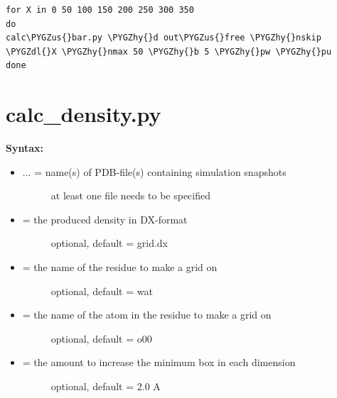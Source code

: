 \documentclass[letterpaper,10pt,english]{sphinxmanual}
\def\PYGZus{\char`\_}
\def\PYGZdl{\char`\$}
\def\PYGZhy{\char`\-}
\begin{document}
\begin{Verbatim}[commandchars=\\\{\}]
for X in 0 50 100 150 200 250 300 350
do
calc\PYGZus{}bar.py \PYGZhy{}d out\PYGZus{}free \PYGZhy{}nskip \PYGZdl{}X \PYGZhy{}nmax 50 \PYGZhy{}b 5 \PYGZhy{}pw \PYGZhy{}pu
done
\end{Verbatim}


\section{calc\_density.py}
\label{tools:calc-density-py}
\textbf{Syntax:}

\begin{itemize}
\item {} \begin{description}
\item[{ ... = name(s) of PDB-file(s) containing simulation snapshots}] \leavevmode
at least one file needs to be specified

\end{description}

\item {} \begin{description}
\item[{ = the produced density in DX-format}] \leavevmode
optional, default = grid.dx

\end{description}

\item {} \begin{description}
\item[{ = the name of the residue to make a grid on}] \leavevmode
optional, default = wat

\end{description}

\item {} \begin{description}
\item[{ = the name of the atom in the residue to make a grid on}] \leavevmode
optional, default = o00

\end{description}

\item {} \begin{description}
\item[{ = the amount to increase the minimum box in each dimension}] \leavevmode
optional, default = 2.0 A


\end{description}
\end{itemize}
\end{document}
